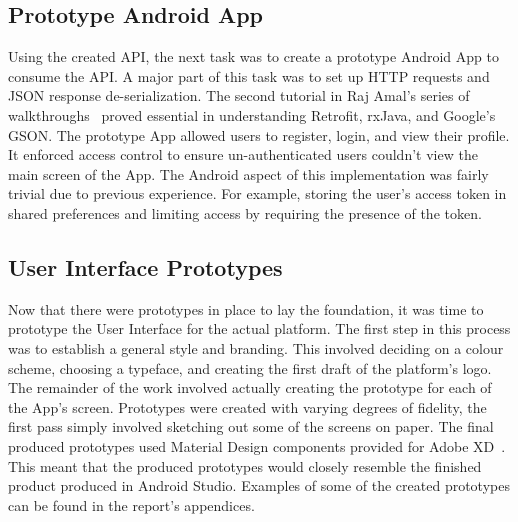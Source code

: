 \subsection{Prototype Android App}
Using the created API, the next task was to create a prototype Android App to consume the API. A major part of this task was to set up HTTP requests and JSON response de-serialization. The second tutorial in Raj Amal's series of walkthroughs~\cite{nodejs_authentication_tutorial_ref} proved essential in understanding Retrofit, rxJava, and Google's GSON. The prototype App allowed users to register, login, and view their profile. It enforced access control to ensure un-authenticated users couldn't view the main screen of the App. The Android aspect of this implementation was fairly trivial due to previous experience. For example, storing the user's access token in shared preferences and limiting access by requiring the presence of the token.

\subsection{User Interface Prototypes}
Now that there were prototypes in place to lay the foundation, it was time to prototype the User Interface for the actual platform. The first step in this process was to establish a general style and branding. This involved deciding on a colour scheme, choosing a typeface, and creating the first draft of the platform's logo. The remainder of the work involved actually creating the prototype for each of the App's screen. Prototypes were created with varying degrees of fidelity, the first pass simply involved sketching out some of the screens on paper. The final produced prototypes used Material Design components provided for Adobe XD~\cite{adobeXD_documentation_ref}. This meant that the produced prototypes would closely resemble the finished product produced in Android Studio. Examples of some of the created prototypes can be found in the report's appendices.


